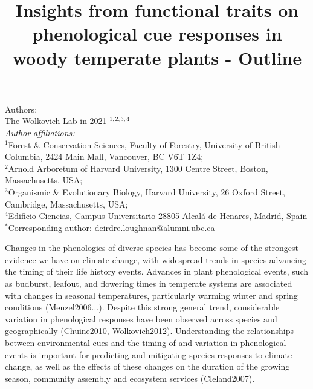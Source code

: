 \documentclass{article}\usepackage[]{graphicx}\usepackage[]{color}
\title{Insights from functional traits on phenological cue responses in woody temperate plants - Outline}
\begin{document}
\maketitle

\noindent Authors:\\
The Wolkovich Lab in 2021 $^{1,2,3,4}$
\vspace{2ex}\\
\emph{Author affiliations:}\\
$^{1}$Forest \& Conservation Sciences, Faculty of Forestry, University of British Columbia, 2424 Main Mall, Vancouver, BC V6T 1Z4;\\
$^{2}$Arnold Arboretum of Harvard University, 1300 Centre Street, Boston, Massachusetts, USA;\\
$^{3}$Organismic \& Evolutionary Biology, Harvard University, 26 Oxford Street, Cambridge, Massachusetts, USA;\\
$^{4}$Edificio Ciencias, Campus Universitario 28805 Alcalá de Henares, Madrid, Spain\\
 

\vspace{2ex}
$^*$Corresponding author: deirdre.loughnan@alumni.ubc.ca\\
\renewcommand{\thetable}{\arabic{table}}
\renewcommand{\thefigure}{\arabic{figure}}
\renewcommand{\labelitemi}{$-$}

Changes in the phenologies of diverse species has become some of the strongest evidence we have on climate change, with widespread trends in species advancing the timing of their life history events. Advances in plant phenological events, such as budburst, leafout, and flowering times in temperate systems are associated with changes in seasonal temperatures, particularly warming winter and spring conditions (Menzel2006...). Despite this strong general trend, considerable variation in phenological responses have been observed across species and geographically (Chuine2010, Wolkovich2012). Understanding the relationships between environmental cues and the timing of and variation in phenological events is important for predicting and mitigating species responses to climate change, as well as the effects of these changes on the duration of the growing season, community assembly and ecosystem services (Cleland2007). 
\end{document}
